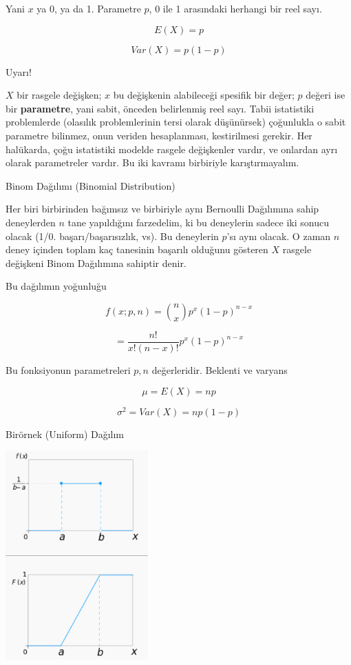 \documentclass[12pt,fleqn]{article}\usepackage{../../common}
\begin{document}
Yani $x$ ya 0, ya da 1. Parametre $p$, 0 ile 1 arasındaki herhangi bir reel 
sayı. 

$$ E(X) = p $$

$$ Var(X) = p(1-p) $$

Uyarı!

$X$ bir rasgele değişken; $x$ bu değişkenin alabileceği spesifik bir değer;
$p$ değeri ise bir \textbf{parametre}, yani sabit, önceden belirlenmiş reel
sayı. Tabii istatistiki problemlerde (olasılık problemlerinin tersi olarak
düşünürsek) çoğunlukla o sabit parametre bilinmez, onun veriden
hesaplanması, kestirilmesi gerekir. Her halükarda, çoğu istatistiki modelde
rasgele değişkenler vardır, ve onlardan ayrı olarak parametreler vardır. Bu
iki kavramı birbiriyle karıştırmayalım.

Binom Dağılımı (Binomial Distribution)

Her biri birbirinden bağımsız ve birbiriyle aynı Bernoulli Dağılımına sahip
deneylerden $n$ tane yapıldığını farzedelim, ki bu deneylerin sadece iki
sonucu olacak (1/0. başarı/başarısızlık, vs). Bu deneylerin $p$'sı aynı
olacak. O zaman $n$ deney içinden toplam kaç tanesinin başarılı olduğunu
gösteren $X$ rasgele değişkeni Binom Dağılımına sahiptir denir. 

Bu dağılımın yoğunluğu 

$$ f(x;p,n) = {n \choose{x}} p^x(1-p)^{n-x} 
$$

$$ = \frac{n!}{x!(n-x)!} p^x(1-p)^{n-x}  $$

Bu fonksiyonun parametreleri $p,n$ değerleridir. Beklenti ve varyans

$$ \mu = E(X) = np $$

$$ \sigma^2 = Var(X) = np(1-p) $$

Birörnek (Uniform) Dağılım

\includegraphics[height=8cm]{stat_intro_05.png}
\end{document}
